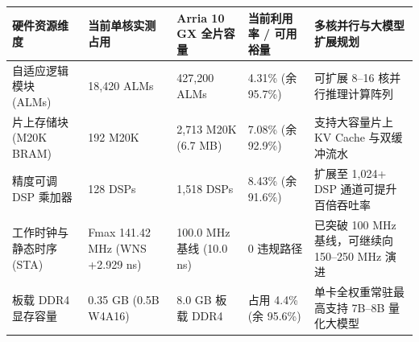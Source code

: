 \documentclass[11pt,a4paper]{article}
\begin{document}
{\footnotesize\renewcommand{\arraystretch}{1.14}\begin{longtable}{@{}L{0.19\textwidth}L{0.16\textwidth}L{0.16\textwidth}L{0.15\textwidth}L{0.24\textwidth}@{}}\toprule

\textbf{硬件资源维度} & \textbf{当前单核实测占用} & \textbf{Arria 10 GX 全片容量} & \textbf{当前利用率 /\allowbreak{} 可用裕量} & \textbf{多核并行与大模型扩展规划}\\\midrule\endhead

自适应逻辑模块 (\allowbreak{}ALMs)\allowbreak{} & 18,\allowbreak{}420 ALMs & 427,\allowbreak{}200 ALMs & 4.31\% (\allowbreak{}余 95.7\%)\allowbreak{} & 可扩展 8–16 核并行推理计算阵列\\[2pt]

片上存储块 (\allowbreak{}M20K BRAM)\allowbreak{} & 192 M20K & 2,\allowbreak{}713 M20K (\allowbreak{}6.7 MB)\allowbreak{} & 7.08\% (\allowbreak{}余 92.9\%)\allowbreak{} & 支持大容量片上 KV Cache 与双缓冲流水\\[2pt]

精度可调 DSP 乘加器 & 128 DSPs & 1,\allowbreak{}518 DSPs & 8.43\% (\allowbreak{}余 91.6\%)\allowbreak{} & 扩展至 1,\allowbreak{}024+\allowbreak{} DSP 通道可提升百倍吞吐率\\[2pt]

工作时钟与静态时序 (\allowbreak{}STA)\allowbreak{} & Fmax 141.42 MHz (\allowbreak{}WNS +\allowbreak{}2.929 ns)\allowbreak{} & 100.0 MHz 基线 (\allowbreak{}10.0 ns)\allowbreak{} & 0 违规路径 & 已突破 100 MHz 基线，可继续向 150–250 MHz 演进\\[2pt]

板载 DDR4 显存容量 & 0.35 GB (\allowbreak{}0.5B W4A16)\allowbreak{} & 8.0 GB 板载 DDR4 & 占用 4.4\% (\allowbreak{}余 95.6\%)\allowbreak{} & 单卡全权重常驻最高支持 7B–8B 量化大模型\\[2pt]

\bottomrule\end{longtable}}
\end{document}
